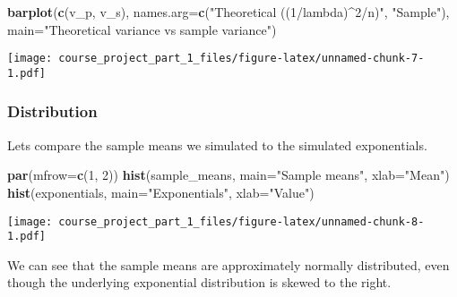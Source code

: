 \documentclass[]{article}
\newenvironment{Shaded}{\begin{snugshade}}{\end{snugshade}}
\newcommand{\KeywordTok}[1]{\textcolor[rgb]{0.13,0.29,0.53}{\textbf{#1}}}
\newcommand{\DataTypeTok}[1]{\textcolor[rgb]{0.13,0.29,0.53}{#1}}
\newcommand{\DecValTok}[1]{\textcolor[rgb]{0.00,0.00,0.81}{#1}}
\newcommand{\StringTok}[1]{\textcolor[rgb]{0.31,0.60,0.02}{#1}}
\newcommand{\NormalTok}[1]{#1}
\begin{document}
\begin{Shaded}
\begin{Highlighting}[]
\KeywordTok{barplot}\NormalTok{(}\KeywordTok{c}\NormalTok{(v_p, v_s), }\DataTypeTok{names.arg=}\KeywordTok{c}\NormalTok{(}\StringTok{"Theoretical ((1/lambda)^2/n)"}\NormalTok{, }\StringTok{"Sample"}\NormalTok{), }\DataTypeTok{main=}\StringTok{"Theoretical variance vs sample variance"}\NormalTok{)}
\end{Highlighting}
\end{Shaded}

\texttt{[image: course\_project\_part\_1\_files/figure-latex/unnamed-chunk-7-1.pdf]}

\subsubsection{Distribution}\label{distribution}

Lets compare the sample means we simulated to the simulated
exponentials.

\begin{Shaded}
\begin{Highlighting}[]
\KeywordTok{par}\NormalTok{(}\DataTypeTok{mfrow=}\KeywordTok{c}\NormalTok{(}\DecValTok{1}\NormalTok{, }\DecValTok{2}\NormalTok{))}
\KeywordTok{hist}\NormalTok{(sample_means, }\DataTypeTok{main=}\StringTok{"Sample means"}\NormalTok{, }\DataTypeTok{xlab=}\StringTok{"Mean"}\NormalTok{)}
\KeywordTok{hist}\NormalTok{(exponentials, }\DataTypeTok{main=}\StringTok{"Exponentials"}\NormalTok{, }\DataTypeTok{xlab=}\StringTok{"Value"}\NormalTok{)}
\end{Highlighting}
\end{Shaded}

\texttt{[image: course\_project\_part\_1\_files/figure-latex/unnamed-chunk-8-1.pdf]}

We can see that the sample means are approximately normally distributed,
even though the underlying exponential distribution is skewed to the
right.
\end{document}
